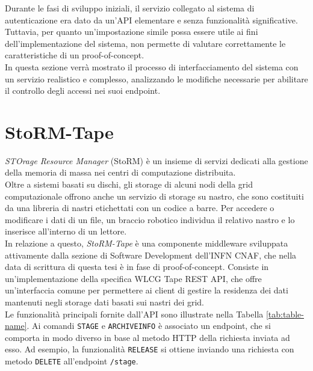 Durante le fasi di sviluppo iniziali, il servizio collegato al sistema di autenticazione era dato da un'API
elementare e senza funzionalità significative.
\\ Tuttavia, per quanto un'impostazione simile possa essere utile ai fini dell'implementazione del sistema, non 
permette di valutare correttamente le caratteristiche di un proof-of-concept.
\\ In questa sezione verrà mostrato il processo di interfacciamento del sistema con un servizio 
realistico e complesso, analizzando le modifiche necessarie per abilitare il controllo degli accessi
nei suoi endpoint. 

\section{StoRM-Tape}
\textit{STOrage Resource Manager} (StoRM) \cite{storm} è un insieme di servizi dedicati alla gestione della memoria 
di massa nei centri di computazione distribuita.
 \\ Oltre a sistemi basati su dischi, gli storage di alcuni nodi della grid computazionale offrono anche 
 un servizio di storage su nastro, che 
sono costituiti da una libreria di nastri etichettati con un codice a barre.
Per accedere o modificare i dati di un file, 
un braccio robotico individua il relativo nastro e lo inserisce all'interno di un lettore.
\\ In relazione a questo, \textit{StoRM-Tape} è una componente middleware sviluppata
attivamente dalla sezione di Software Development dell'INFN CNAF, che nella data di scrittura di questa tesi è in fase di proof-of-concept.
Consiste in un'implementazione della specifica {WLCG Tape REST API}, che offre un'interfaccia comune per permettere 
ai client di gestire la residenza dei dati mantenuti negli storage dati basati sui nastri dei grid. 
\\ Le funzionalità principali fornite dall'API sono illustrate nella Tabella \ref*{tab:table-name}. Ai comandi \texttt{STAGE} e \texttt{ARCHIVEINFO} è associato un endpoint,
che si comporta in modo diverso in base al metodo HTTP della richiesta inviata ad esso. Ad esempio, la funzionalità \texttt{RELEASE}
si ottiene inviando una richiesta con metodo \texttt{DELETE} all'endpoint \texttt{/stage}.

